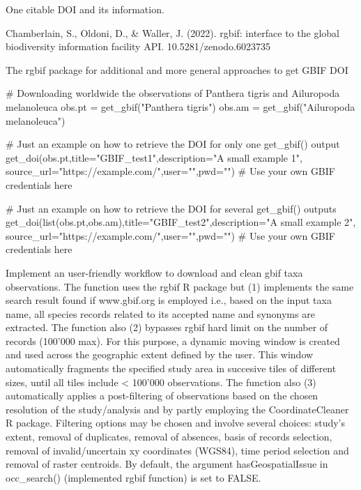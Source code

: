 \documentclass[a4paper]{book}
\begin{document}
%
\begin{Value}
One citable DOI and its information.
\end{Value}
%
\begin{References}\relax
Chamberlain, S., Oldoni, D., \& Waller, J. (2022). rgbif: interface to the global biodiversity
information facility API. 10.5281/zenodo.6023735
\end{References}
%
\begin{SeeAlso}\relax
The rgbif package for additional and more general approaches to get GBIF DOI
\end{SeeAlso}
%
\begin{Examples}
\begin{ExampleCode}

# Downloading worldwide the observations of Panthera tigris and Ailuropoda melanoleuca
obs.pt = get_gbif("Panthera tigris")
obs.am = get_gbif("Ailuropoda melanoleuca")

# Just an example on how to retrieve the DOI for only one get_gbif() output
get_doi(obs.pt,title="GBIF_test1",description="A small example 1",
    source_url="https://example.com/",user="",pwd="") # Use your own GBIF credentials here

# Just an example on how to retrieve the DOI for several get_gbif() outputs
get_doi(list(obs.pt,obs.am),title="GBIF_test2",description="A small example 2",
    source_url="https://example.com/",user="",pwd="") # Use your own GBIF credentials here

\end{ExampleCode}
\end{Examples}
%
\begin{Description}\relax
Implement an user-friendly workflow to download and clean gbif taxa observations.
The function uses the rgbif R package but (1) implements the same search result 
found if www.gbif.org is employed i.e., based on the input taxa name, all species
records related to its accepted name and synonyms are extracted. The function
also (2) bypasses rgbif hard limit on the number of records (100'000 max).
For this purpose, a dynamic moving window is created and used across the geographic
extent defined by the user. This window automatically fragments the specified
study area in succesive tiles of different sizes, until all tiles include < 100'000
observations. The function also (3) automatically applies a post-filtering of
observations based on the chosen resolution of the study/analysis and by partly
employing the CoordinateCleaner R package. Filtering options may be chosen and
involve several choices: study's extent, removal of duplicates, removal of absences,
basis of records selection, removal of invalid/uncertain xy coordinates (WGS84), time
period selection and removal of raster centroids. By default, the argument
hasGeospatialIssue in occ\_search() (implemented rgbif function) is set to FALSE.
\end{Description}
\end{document}
